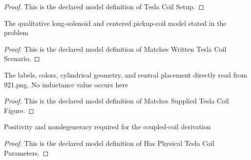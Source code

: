 \begin{proof}
  This is the declared model definition of Tesla Coil Setup.
\end{proof}
\begin{definition}
  \label{def:physics:phyx-mini-0921:phyxminiproblems-problemphyxmini0921-matcheswrittenteslacoilscenario}
  The qualitative long-solenoid and centered pickup-coil model stated in the problem
\end{definition}
\begin{proof}
  This is the declared model definition of Matches Written Tesla Coil Scenario.
\end{proof}
\begin{definition}
  \label{def:physics:phyx-mini-0921:phyxminiproblems-problemphyxmini0921-matchessuppliedteslacoilfigure}
  The labels, colors, cylindrical geometry, and central placement directly read from 921.png. No inductance value occurs here
\end{definition}
\begin{proof}
  This is the declared model definition of Matches Supplied Tesla Coil Figure.
\end{proof}
\begin{definition}
  \label{def:physics:phyx-mini-0921:phyxminiproblems-problemphyxmini0921-hasphysicalteslacoilparameters}
  Positivity and nondegeneracy required for the coupled-coil derivation
\end{definition}
\begin{proof}
  This is the declared model definition of Has Physical Tesla Coil Parameters.
\end{proof}
